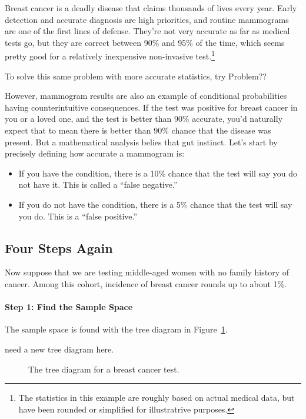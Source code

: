 Breast cancer is a deadly disease that claims thousands of lives every
year.  Early detection and accurate diagnosis are high priorities, and
routine mammograms are one of the first lines of defense.  They're not
very accurate as far as medical tests go, but they are correct between
90\% and 95\% of the time, which seems pretty good for a relatively
inexpensive non-invasive test.\footnote{The statistics in this example
  are roughly based on actual medical data, but have been rounded or
  simplified for illustratrive purposes.}
\begin{editingnotes}
  To solve this same problem
  with more accurate statistics, try Problem??
\end{editingnotes}
However, mammogram results are also an example of conditional
probabilities having counterintuitive consequences.  If the test was
positive for breast cancer in you or a loved one, and the test is
better than 90\% accurate, you'd naturally expect that to mean there
is better than 90\% chance that the disease was present. But a
mathematical analysis belies that gut instinct.  Let's start by
precisely defining how accurate a mammogram is:
\begin{itemize}

\item If you have the condition, there is a 10\% chance that the test
  will say you do not have it.  This is called a ``false negative.''

\item If you do not have the condition, there is a 5\% chance that the
  test will say you do.  This is a ``false positive.''

\end{itemize}

\subsection{Four Steps Again}

Now suppose that we are testing middle-aged women with no family
history of cancer.  Among this cohort, incidence of breast cancer
rounds up to about 1\%.

\paragraph{Step 1: Find the Sample Space}

The sample space is found with the tree diagram in
Figure~\ref{fig:15C1}.
\begin{editingnotes}
need a new tree diagram here.
\end{editingnotes}
\begin{figure}[h]


\caption{The tree diagram for a breast cancer test.}

\label{fig:15C1}

\end{figure}

